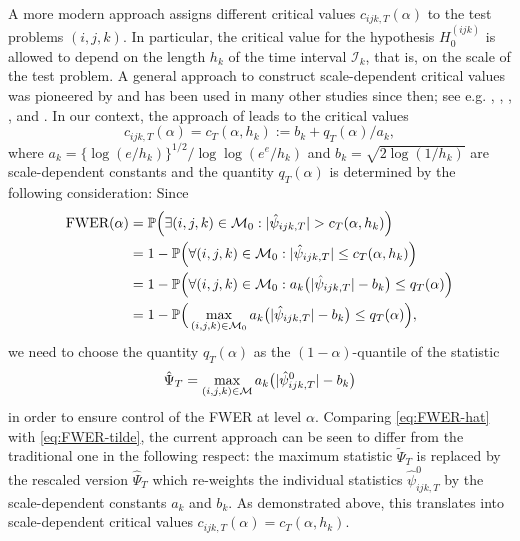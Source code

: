 \documentclass[a4paper,12pt]{article}
\numberwithin{equation}{section}
\begin{document}
A more modern approach assigns different critical values $c_{ijk,T}(\alpha)$ to the test problems $(i,j,k)$. In particular, the critical value for the hypothesis $H_0^{(ijk)}$ is allowed to depend on the length $h_k$ of the time interval $\mathcal{I}_k$, that is, on the scale of the test problem. A general approach to construct scale-dependent critical values was pioneered by \cite{DuembgenSpokoiny2001} and has been used in many other studies since then; {\color{red}see e.g.} \cite{Rohde2008}, \cite{DuembgenWalther2008}, \cite{RufibachWalther2010}, \cite{SchmidtHieber2013}, \cite{EckleBissantzDette2017} and \cite{Dunker2019}. In our context, the approach of \cite{DuembgenSpokoiny2001} leads to the critical values 
\begin{equation*}
c_{ijk,T}(\alpha) = c_T(\alpha,h_k) := b_k + q_T(\alpha)/a_k, 
\end{equation*}
where $a_k = \{\log(e/h_k)\}^{1/2} / \log \log(e^e / h_k)$ and $b_k = \sqrt{2 \log(1/h_k)}$ are scale-dependent constants and the quantity $q_T(\alpha)$ is determined by the following consideration: Since 
\begin{align}
\text{FWER}(\alpha)
  & = \mathbb{P} \Big( \exists (i,j,k) \in \mathcal{M}_0: |\hat{\psi}_{ijk,T}| > c_T(\alpha,h_k) \Big) \nonumber \\
 & =  1 - \mathbb{P} \Big( \forall (i,j,k) \in \mathcal{M}_0: |\hat{\psi}_{ijk,T}| \le c_T(\alpha,h_k) \Big) \nonumber \\
 & =  1 - \mathbb{P} \Big( \forall (i,j,k) \in \mathcal{M}_0: a_k \big(|\hat{\psi}_{ijk,T}| - b_k\big) \le q_T(\alpha) \Big) \nonumber \\
 & = 1 - \mathbb{P}\Big( \max_{(i,j,k) \in \mathcal{M}_0} a_k \big( |\hat{\psi}_{ijk,T}| - b_k \big) \le q_T(\alpha) \Big), \label{eq:FWER-hat}
\end{align}
we need to choose the quantity $q_T(\alpha)$ as the $(1-\alpha)$-quantile of the statistic 
\[ \hat{\Psi}_T = \max_{(i,j,k) \in \mathcal{M}} a_k \big( |\hat{\psi}_{ijk,T}^0| - b_k \big) \]
in order to ensure control of the FWER at level $\alpha$. Comparing \eqref{eq:FWER-hat} with \eqref{eq:FWER-tilde}, the current approach can be seen to differ from the traditional one in the following respect: the maximum statistic $\tilde{\Psi}_T$ is replaced by the rescaled version $\hat{\Psi}_T$ which re-weights the individual statistics $\hat{\psi}_{ijk,T}^0$ by the scale-dependent constants $a_k$ and $b_k$. As demonstrated above, this translates into scale-dependent critical values $c_{ijk,T}(\alpha) = c_T(\alpha,h_k)$. 
\end{document}
